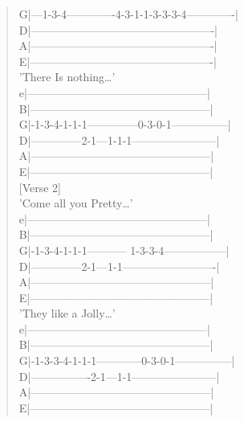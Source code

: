 \documentclass[11pt]{article}
\begin{document}
\begin{verse}
G|---1-3-4-------------4-3-1-1-3-3-3-4-------------|\\
D|-------------------------------------------------|\\
A|-------------------------------------------------|\\
E|-------------------------------------------------|\\
\vspace*{1em}
'There Is nothing\ldots{}'\\
e|------------------------------------------------|\\
B|------------------------------------------------|\\
G|-1-3-4-1-1-1--------------0-3-0-1---------------|\\
D|--------------2-1---1-1-1-----------------------|\\
A|------------------------------------------------|\\
E|------------------------------------------------|\\
\vspace*{1em}
\vspace*{1em}
[Verse 2]\\
\vspace*{1em}
'Come all you Pretty\ldots{}'\\
e|------------------------------------------------|\\
B|------------------------------------------------|\\
G|-1-3-4-1-1-1----------- 1-3-3-4-----------------|\\
D|--------------2-1---1-1-------------------------|\\
A|------------------------------------------------|\\
E|------------------------------------------------|\\
\vspace*{1em}
'They like a Jolly\ldots{}'\\
e|------------------------------------------------|\\
B|------------------------------------------------|\\
G|-1-3-3-4-1-1-1------------0-3-0-1---------------|\\
D|----------------2-1---1-1-----------------------|\\
A|------------------------------------------------|\\
E|------------------------------------------------|\\

\end{verse}
\end{document}
